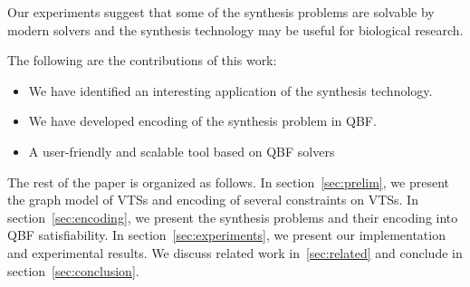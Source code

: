 Our experiments suggest that some of the synthesis problems are
solvable by modern solvers and the synthesis technology may be useful
for biological research.
%

The following are the contributions of this work:
\begin{itemize}
\item We have identified an interesting application of
  the synthesis technology.
\item We have developed encoding of the synthesis problem in QBF.
\item A user-friendly and scalable tool based on QBF solvers
\end{itemize}

The rest of the paper is organized as follows.
%
In section~\ref{sec:prelim}, we present the graph model of VTSs and encoding of several
constraints on VTSs.
%
In section~\ref{sec:encoding}, we present the synthesis problems and their
encoding into QBF satisfiability.
%
In section~\ref{sec:experiments}, we present our implementation and experimental results.
%
We discuss related work in~\ref{sec:related} and conclude in section~\ref{sec:conclusion}.

